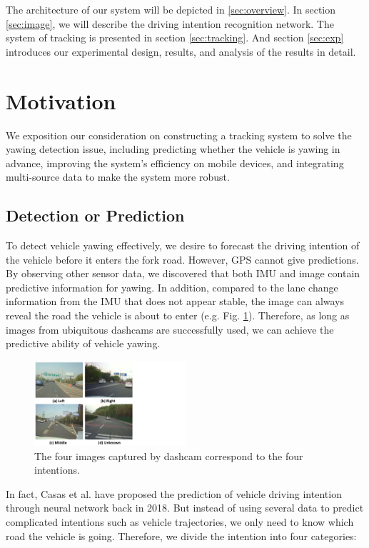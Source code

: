 \documentclass[journal]{IEEEtran}
\begin{document}
The architecture of our system will be depicted in \ref{sec:overview}.
In section \ref{sec:image}, we will describe the driving intention recognition network.
The system of tracking is presented in section \ref{sec:tracking}.
And section \ref{sec:exp} introduces our experimental design, results, and analysis of the results in detail.

\section{Motivation}
We exposition our consideration on constructing a tracking system to solve the yawing detection issue, including predicting whether the vehicle is yawing in advance, improving the system's efficiency on mobile devices, and integrating multi-source data to make the system more robust.

\subsection{Detection or Prediction}
To detect vehicle yawing effectively, we desire to forecast the driving intention of the vehicle before it enters the fork road. However, GPS cannot give predictions. By observing other sensor data, we discovered that both IMU and image contain predictive information for yawing. In addition, compared to the lane change information from the IMU that does not appear stable, the image can always reveal the road the vehicle is about to enter (e.g. Fig. \ref{fig:intent}). Therefore, as long as images from ubiquitous dashcams are successfully used, we can achieve the predictive ability of vehicle yawing.

\begin{figure}[htbp]
    \centerline{\includegraphics[width=0.5\textwidth]{fig/intention.pdf}}
    \caption{The four images captured by dashcam correspond to the four intentions. }
    \label{fig:intent}
\end{figure}

In fact, Casas et al. \cite{casas2018intentnet} have proposed the prediction of vehicle driving intention through neural network back in 2018. But instead of using several data to predict complicated intentions such as vehicle trajectories, we only need to know which road the vehicle is going. Therefore, we divide the intention into four categories: 
\end{document}
